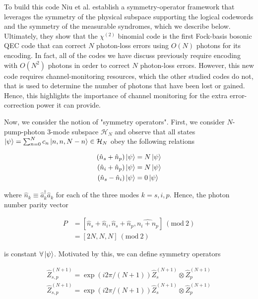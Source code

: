 \documentclass[12]{amsart}
\newcommand\0{\mathbf{0}}
\newcommand\<{\langle}
\renewcommand\>{\rangle}
\renewcommand\mod[1]{\ (\mathrm{mod}\ #1)}
\begin{document}
To build this code Niu et al. establish a symmetry-operator framework that leverages the symmetry of the physical subspace supporting the logical codewords and the symmetry of the measurable syndromes, which we describe below. Ultimately, they show that the $\chi^{(2)}$ binomial code is the first Fock-basis bosonic QEC code that can correct $N$ photon-loss errors using $O(N)$ photons for its encoding. In fact, all of the codes we have discuss previously require encoding with $O(N^2)$ photons in order to correct $N$ photon-loss errors. However, this new code requires channel-monitoring resources, which the other studied codes do not, that is used to determine the number of photons that have been lost or gained. Hence, this highlights the importance of channel monitoring for the extra error-correction power it can provide.

Now, we consider the notion of "symmetry operators". First, we consider $N$-pump-photon 3-mode subspace $\mathcal{H}_N$ and observe that all states $\ket{\psi} = \sum_{n=0}^N c_n \ket{n, n, N-n} \in \mathcal{H}_N$ obey the following relations

\begin{align}
\begin{split}
	(\hat{n}_s + \hat{n}_p) \ket{\psi} &= N\ket{\psi} \\
	(\hat{n}_i + \hat{n}_p) \ket{\psi} &= N\ket{\psi} \\
	(\hat{n}_s - \hat{n}_i) \ket{\psi} &= 0\ket{\psi}
\end{split}
\end{align}

where $\hat{n}_k \equiv \hat{a}_k^\dag\hat{a}_k$ for each of the three modes $k = s, i, p$. Hence, the photon number parity vector

\begin{align*}
P &= [\hat{n}_s + \hat{n}_i, \hat{n}_s + \hat{n}_p, \hat{n_i + n_p}  ] \mod 2\\
&= [2N, N, N] \mod 2
\end{align*}

is constant $\forall \ket{\psi}$. Motivated by this, we can define symmetry operators 

\begin{align*}
\hat{Z}_{s, p}^{(N + 1)} = \exp(i 2 \pi / (N+1))	\hat{Z}_{s}^{(N + 1)} \otimes \hat{Z}_{p}^{(N + 1)} \\
\hat{Z}_{s, p}^{(N + 1)} = \exp(i 2 \pi / (N+1))	\hat{Z}_{s}^{(N + 1)} \otimes \hat{Z}_{p}^{(N + 1)}
\end{align*}
\end{document}
